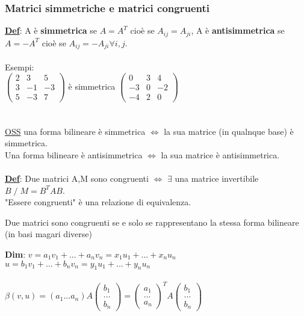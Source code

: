 \documentclass[12pt]{article}
\begin{document}
\subsubsection{Matrici simmetriche e matrici congruenti}
\textbf{\underline{Def}}: A è \textbf{simmetrica} se $A = A^T$ cioè se $A_{ij} = A_{ji}$, A è \textbf{antisimmetrica} se $A = -A^T$ cioè se $A_{ij} = -A_{ji} \forall i,j$.\\\\
Esempi:\\
$\begin{pmatrix}
    2 & 3 & 5\\
    3 & -1 & -3\\
    5 & -3 & 7
\end{pmatrix}$ è simmetrica $\begin{pmatrix}
    0 & 3 & 4\\
    -3 & 0 & -2\\
    -4& 2 & 0
\end{pmatrix}$\\\\\\
\underline{OSS} una forma bilineare è simmetrica $\iff$ la sua matrice (in qualnque base) è simmetrica.\\
Una forma bilineare è antisimmetrica $\iff$ la sua matrice è antisimmetrica.\\\\
\textbf{\underline{Def}}: Due matrici A,M sono congruenti $\iff$ $\exists$ una matrice invertibile $B \;/\; M = B^TAB$.\\
"Essere congruenti" è una relazione di equivalenza.
\begin{theorem}
    Due matrici sono congruenti se e solo se rappresentano la stessa forma bilineare (in basi magari diverse)
\end{theorem}
\textbf{Dim}: $v = a_1v_1+...+a_nv_n = x_1u_1+...+x_nu_n$\\
$u = b_1v_1+...+b_nv_n = y_1u_1+...+y_nu_n$\\\\
$\beta(v,u) = (a_1...a_n)A\begin{pmatrix}
    b_1\\
    ...\\
    b_n
\end{pmatrix} = \begin{pmatrix}
    a_1\\
    ...\\
    a_n
\end{pmatrix}^TA\begin{pmatrix}
    b_1\\
    ...\\
    b_n
\end{pmatrix}\quad$
\end{document}
